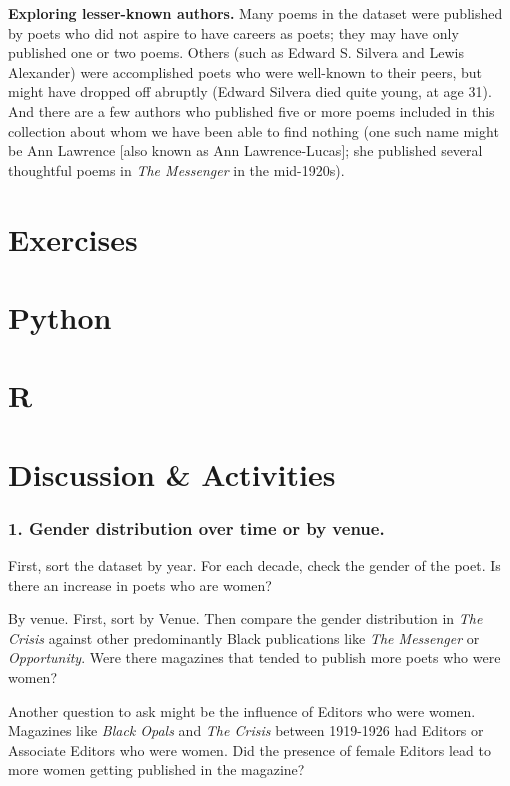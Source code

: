 \documentclass[
  letterpaper,
  DIV=11,
  numbers=noendperiod]{scrartcl}
\begin{document}
\textbf{Exploring lesser-known authors. }Many poems in the dataset were
published by poets who did not aspire to have careers as poets; they may
have only published one or two poems. Others (such as Edward S. Silvera
and Lewis Alexander) were accomplished poets who were well-known to
their peers, but might have dropped off abruptly (Edward Silvera died
quite young, at age 31). And there are a few authors who published five
or more poems included in this collection about whom we have been able
to find nothing (one such name might be Ann Lawrence {[}also known as
Ann Lawrence-Lucas{]}; she published several thoughtful poems in
\emph{The Messenger} in the mid-1920s).

\section{Exercises}

\section{Python}

\label{exercise-posts}

\section{R}

\section{Discussion \& Activities}

\subsubsection{1. Gender distribution over time or by
venue.}\label{gender-distribution-over-time-or-by-venue.}

First, sort the dataset by year. For each decade, check the gender of
the poet. Is there an increase in poets who are women?

By venue. First, sort by Venue. Then compare the gender distribution in
\emph{The Crisis} against other predominantly Black publications like
\emph{The Messenger} or \emph{Opportunity}. Were there magazines that
tended to publish more poets who were women?

Another question to ask might be the influence of Editors who were
women. Magazines like \emph{Black Opals} and \emph{The Crisis} between
1919-1926 had Editors or Associate Editors who were women. Did the
presence of female Editors lead to more women getting published in the
magazine?
\end{document}
